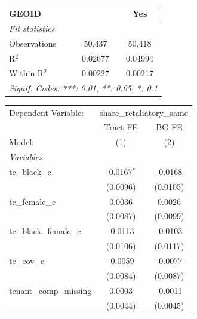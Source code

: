 \begin{tabular}{lcc}
   GEOID                                                 &                 & Yes\\  
   \midrule
   \emph{Fit statistics}\\
   Observations                                          & 50,437          & 50,418\\  
   R$^2$                                                 & 0.02677         & 0.04994\\  
   Within R$^2$                                          & 0.00227         & 0.00217\\  
   \midrule \midrule
   \multicolumn{3}{l}{\emph{Signif. Codes: ***: 0.01, **: 0.05, *: 0.1}}\\
\end{tabular}
\par\endgroup
\begingroup
\centering
\begin{tabular}{lcc}
   \tabularnewline \midrule \midrule
   Dependent Variable: & \multicolumn{2}{c}{share\_retaliatory\_same}\\
                                                         & Tract FE        & BG FE \\   
   Model:                                                & (1)             & (2)\\  
   \midrule
   \emph{Variables}\\
   tc\_black\_c                                          & -0.0167$^{*}$   & -0.0168\\   
                                                         & (0.0096)        & (0.0105)\\   
   tc\_female\_c                                         & 0.0036          & 0.0026\\   
                                                         & (0.0087)        & (0.0099)\\   
   tc\_black\_female\_c                                  & -0.0113         & -0.0103\\   
                                                         & (0.0106)        & (0.0117)\\   
   tc\_cov\_c                                            & -0.0059         & -0.0077\\   
                                                         & (0.0084)        & (0.0087)\\   
   tenant\_comp\_missing                                 & 0.0003          & -0.0011\\   
                                                         & (0.0044)        & (0.0045)\\   

\end{tabular}

